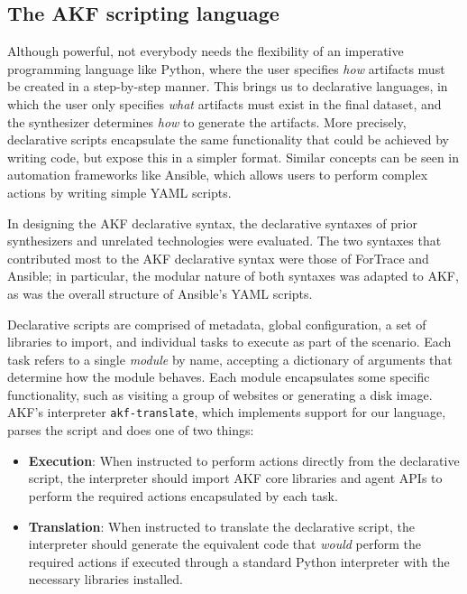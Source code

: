 \subsection{The AKF scripting
language}\label{the-akf-scripting-language}

Although powerful, not everybody needs the flexibility of an imperative
programming language like Python, where the user specifies \emph{how}
artifacts must be created in a step-by-step manner. This brings us to
declarative languages, in which the user only specifies \emph{what}
artifacts must exist in the final dataset, and the synthesizer
determines \emph{how} to generate the artifacts. More precisely,
declarative scripts encapsulate the same functionality that could be
achieved by writing code, but expose this in a simpler format. Similar
concepts can be seen in automation frameworks like Ansible, which allows
users to perform complex actions by writing simple YAML scripts.

In designing the AKF declarative syntax, the declarative syntaxes of
prior synthesizers and unrelated technologies were evaluated. The two
syntaxes that contributed most to the AKF declarative syntax were those
of ForTrace and Ansible; in particular, the modular nature of both
syntaxes was adapted to AKF, as was the overall structure of Ansible's
YAML scripts.

Declarative scripts are comprised of metadata, global configuration, a
set of libraries to import, and individual tasks to execute as part of
the scenario. Each task refers to a single \emph{module} by name,
accepting a dictionary of arguments that determine how the module
behaves. Each module encapsulates some specific functionality, such as
visiting a group of websites or generating a disk image. AKF's
interpreter \passthrough{\lstinline!akf-translate!}, which implements
support for our language, parses the script and does one of two things:

\begin{itemize}
\item
  \textbf{Execution}: When instructed to perform actions directly from
  the declarative script, the interpreter should import AKF core
  libraries and agent APIs to perform the required actions encapsulated
  by each task.
\item
  \textbf{Translation}: When instructed to translate the declarative
  script, the interpreter should generate the equivalent code that
  \emph{would} perform the required actions if executed through a
  standard Python interpreter with the necessary libraries installed.
\end{itemize}

